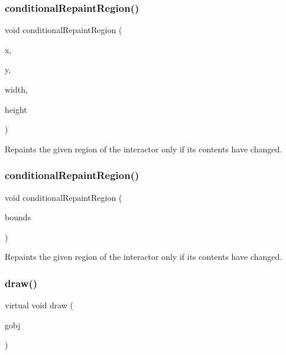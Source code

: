 \subsubsection{\texorpdfstring{conditional\+Repaint\+Region()}{conditionalRepaintRegion()}\hspace{0.1cm}{\footnotesize\ttfamily [1/2]}}
{\footnotesize\ttfamily void conditional\+Repaint\+Region (\begin{DoxyParamCaption}\item[{int}]{x,  }\item[{int}]{y,  }\item[{int}]{width,  }\item[{int}]{height }\end{DoxyParamCaption})\hspace{0.3cm}{\ttfamily [virtual]}}



Repaints the given region of the interactor only if its contents have changed. 

\mbox{\label{classGDrawingSurface_a3932a12278752db368e24fa404e446aa}} 
\subsubsection{\texorpdfstring{conditional\+Repaint\+Region()}{conditionalRepaintRegion()}\hspace{0.1cm}{\footnotesize\ttfamily [2/2]}}
{\footnotesize\ttfamily void conditional\+Repaint\+Region (\begin{DoxyParamCaption}\item[{const \mbox{\hyperlink{structGRectangle}{G\+Rectangle}} \&}]{bounds }\end{DoxyParamCaption})\hspace{0.3cm}{\ttfamily [virtual]}}



Repaints the given region of the interactor only if its contents have changed. 

\mbox{\label{classGDrawingSurface_ae65b7cc9bdfbc1bd01bec80ba83aab47}} 
\subsubsection{\texorpdfstring{draw()}{draw()}\hspace{0.1cm}{\footnotesize\ttfamily [1/4]}}
{\footnotesize\ttfamily virtual void draw (\begin{DoxyParamCaption}\item[{\mbox{\hyperlink{classGObject}{G\+Object}} $\ast$}]{gobj }\end{DoxyParamCaption})\hspace{0.3cm}{\ttfamily [pure virtual]}}



